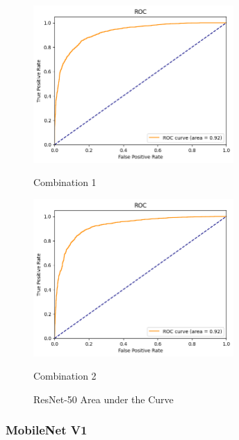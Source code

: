 \begin{figure}[H]
    \centering
    \begin{minipage}[b]{0.49\textwidth}
        \centering
        \includegraphics[width=\textwidth, height=6cm]{Figures/balanced_data/more_data/withoutbn/resnet/roc.png}
        \captionsetup{labelformat=empty}
        \caption{Combination 1}
        \label{fig:u_wo_r_roc}
    \end{minipage}
    \hfill
    \begin{minipage}[b]{0.49\textwidth}
        \centering
        \includegraphics[width=\textwidth, height=6cm]{Figures/balanced_data/more_data/withbn/resnet/roc.png}
        \captionsetup{labelformat=empty}
        \caption{Combination 2}
        \label{fig:u_w_r_roc}
    \end{minipage}
    \captionsetup{labelformat=default}
    \caption{ResNet-50 Area under the Curve}
\end{figure}

\subsubsection{MobileNet V1}


